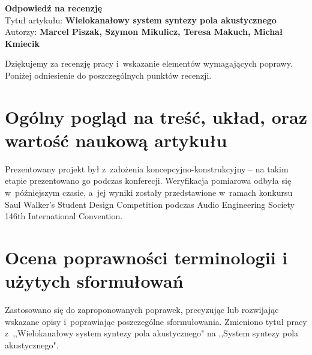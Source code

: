 \documentclass[12pt]{article}
\begin{document}
    \begin{center}
        \textbf{\large Odpowiedź na recenzję }\\
        \vspace{10pt}
        Tytuł artykułu: \textbf{Wielokanałowy system syntezy pola akustycznego}
        \\
        Autorzy: \textbf{Marcel Piszak, Szymon Mikulicz, Teresa Makuch, Michał
        Kmiecik}
    \end{center}

Dziękujemy za recenzję pracy i~wskazanie elementów wymagających poprawy.
Poniżej odniesienie do poszczególnych punktów recenzji.

\section{Ogólny pogląd na treść, układ, oraz wartość
naukową artykułu}

Prezentowany projekt był z~założenia koncepcyjno-konstrukcyjny -- na takim
etapie prezentowano go podczas konferecji. Weryfikacja pomiarowa odbyła się
w~późniejszym czasie, a~jej wyniki zostały przedstawione w~ramach konkursu Saul
Walker's Student Design Competition podczas Audio Engineering Society 146th
International Convention.

\section{Ocena poprawności terminologii i użytych sformułowań}

Zastosowano się do zaproponowanych poprawek, precyzując lub rozwijając wskazane
opisy i~poprawiając poszczególne sformułowania. Zmieniono tytuł pracy z~,,Wielokanałowy system syntezy pola akustycznego" na ,,System syntezy pola akustycznego".
\end{document}
